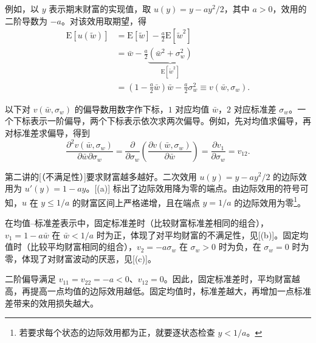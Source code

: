 例如，以 $y$ 表示期末财富的实现值，取 $u(y)=y-ay^2/2$，其中 $a>0$，效用的二阶导数为 $-a$。对该效用取期望，得
\[
 \begin{aligned}
 \mathrm E[u(\widetilde w)]
 &=\mathrm E[\widetilde w]-\frac a2\mathrm E[\widetilde w^2]\\
 &=\bar w-\frac a2\underbrace{(\bar w^2+\sigma_w^2)}_{\mathrm E[\widetilde w^2]}\\
 &=\left(1-\frac a2\bar w\right)\bar w-\frac a2\sigma_w^2
 \equiv v(\bar w,\sigma_w).
 \end{aligned}
\]

以下对 $v(\bar w,\sigma_w)$ 的偏导数用数字作下标，$1$ 对应均值 $\bar w$，$2$ 对应标准差 $\sigma_w$。一个下标表示一阶偏导，两个下标表示依次求两次偏导。例如，先对均值求偏导，再对标准差求偏导，得到
\[
 \frac{\partial^2 v(\bar w,\sigma_w)}{\partial\bar w\partial\sigma_w}
 =\frac{\partial}{\partial\sigma_w}
   \left(\frac{\partial v(\bar w,\sigma_w)}{\partial\bar w}\right)
 =\frac{\partial v_1}{\partial\sigma_w}
 =v_{12}.
\]



第二讲的[（不满足性）]要求财富越多越好。二次效用 $u(y)=y-ay^2/2$ 的边际效用为 $u'(y)=1-ay$。[(a)] 标出了边际效用降为零的端点。由边际效用的符号可知，$u$ 在 $y\le 1/a$ 的财富区间上严格递增，且在端点 $y=1/a$ 的边际效用为零\footnote{若要求每个状态的边际效用都为正，就要逐状态检查 $y<1/a$。}。

在均值--标准差表示中，固定标准差时（比较财富标准差相同的组合），$v_1=1-a\bar w$ 在 $\bar w<1/a$ 时为正，体现了对平均财富的不满足性，见[(b)]。固定均值时（比较平均财富相同的组合），$v_2=-a\sigma_w$ 在 $\sigma_w>0$ 时为负，在 $\sigma_w=0$ 时为零，体现了对财富波动的厌恶，见[(c)]。

\begin{center}
\begin{minipage}{\linewidth}
\centering
\renewcommand{\thewjFigure}{\thechapter.S\arabic{wjFigure}}%
%
\par
{}
\end{minipage}
\end{center}

二阶偏导满足 $v_{11}=v_{22}=-a<0$、$v_{12}=0$。因此，固定标准差时，平均财富越高，再提高一点均值的边际效用越低。固定均值时，标准差越大，再增加一点标准差带来的效用损失越大。

